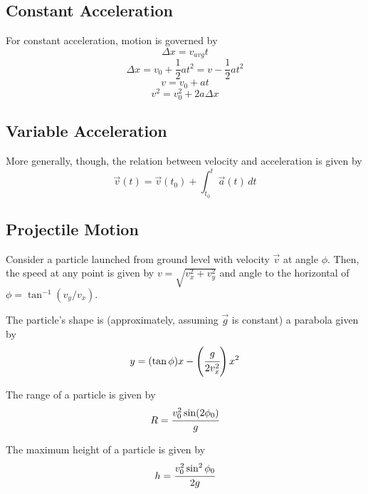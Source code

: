 \documentclass[../PhysicsFormulae.tex]{subfiles}
\begin{document}
\subsection{Constant Acceleration}
For constant acceleration, motion is governed by
\[\Delta x = v_{avg}t\]
\[\Delta x = v_0 + \frac{1}{2}at^2 = v - \frac{1}{2}at^2\]
\[v=v_0+at\]
\[v^2 = v_0^2 + 2a \Delta x\]

\subsection{Variable Acceleration}
More generally, though, the relation between velocity and acceleration is given by
\[\vec{v}(t) = \vec{v}(t_0) + \int_{t_0}^{t} \vec{a}(t) \,dt \]

\subsection{Projectile Motion}
Consider a particle launched from ground level with velocity $\vec{v}$ at angle $\phi$. Then, the speed at any point is given by $v = \sqrt{v_x^2+v_y^2}$ and angle to the horizontal of $\phi = \tan^{-1}(v_y/v_x)$. \bigskip

The particle's shape is (approximately, assuming $\vec{g}$ is constant) a parabola given by
\[y = (\tan{\phi})x - \left(\cfrac{g}{2v_x^2}\right)x^2\]

The range of a particle is given by
\[R = \cfrac{v_0^2 \sin(2\phi_0)}{g}\]

The maximum height of a particle is given by
\[h = \cfrac{v_0^2 \sin^2{\phi_0}}{2g}\]
\end{document}
